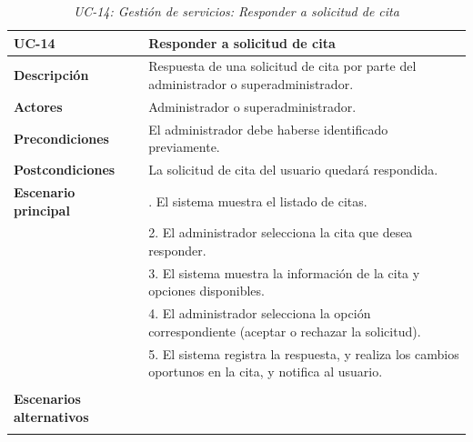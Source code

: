 \begin{table}[H]
  \begin{center}
    \begin{tabularx}{16.4cm}{|l|X|}
      \hline
      \textbf{UC-14} & \textbf{Responder a solicitud de cita}\\
      \hline
      \textbf{Descripción} & Respuesta de una solicitud de cita por parte del administrador o superadministrador. \\
      \hline
      \textbf{Actores} & Administrador o superadministrador.\\
      \hline
      \textbf{Precondiciones} & El administrador debe haberse identificado previamente.\\
      \hline
      \textbf{Postcondiciones} & La solicitud de cita del usuario quedará respondida.\\
      \hline
      \textbf{Escenario principal} & \smallskip 1. El sistema muestra el listado de citas.\\
      & 2. El administrador selecciona la cita que desea responder.\\
      & 3. El sistema muestra la información de la cita y opciones disponibles.\\
      & 4. El administrador selecciona la opción correspondiente (aceptar o rechazar la solicitud).\\
      & 5. El sistema registra la respuesta, y realiza los cambios oportunos en la cita, y notifica al usuario.\\
      & \\
      \hline
      \textbf{Escenarios alternativos} & \\
      & \\
      \hline
    \end{tabularx}
    \caption{\textit{UC-14: Gestión de servicios: Responder a solicitud de cita}}
    \label{tab:CU-responder-solicitud-cita}
  \end{center}
\end{table}


